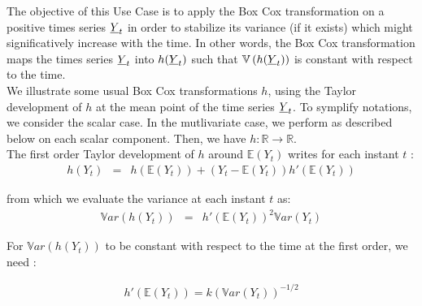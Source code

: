 \renewcommand{\filename}{docUC_StocProc_BoxCox.tex}
\renewcommand{\filetitle}{UC : Box Cox method : identification and transformation}

\HeaderIIILevel

\label{BoxCox}


The objective of this Use Case  is to apply the Box Cox transformation on a positive times series ${\underline{Y}}_t$ in order to stabilize its variance (if it exists) which might significatively increase with the time. In other words, the Box Cox transformation maps the times series ${\underline{Y}}_t$ into $h({\underline{Y}}_t)$ such that  $\mathbb{V}\left(h({\underline{Y}}_t)\right)$ is constant  with respect to the time.\\


We illustrate some usual Box Cox transformations $h$, using the Taylor development of $h$ at the mean point of the time series ${\underline{Y}}_t$. To symplify notations, we consider the scalar case. In the mutlivariate case, we perform as described below on each scalar component. Then,  we have $h : \mathbb{R} \longrightarrow \mathbb{R}$.\\
The first order Taylor development of $h$ around $\mathbb{E}(Y_t)$ writes for each instant $t$ : 
\begin{eqnarray*}
 h(Y_t) & = & h(\mathbb{E}(Y_t)) + (Y_t - \mathbb{E}(Y_t))h'(\mathbb{E}(Y_t)) 
\end{eqnarray*}

from which we evaluate the variance at each instant $t$ as:
\begin{eqnarray*}
 \mathbb{V}ar(h(Y_t)) & = & h'(\mathbb{E}(Y_t))^2  \mathbb{V}ar(Y_t) 
\end{eqnarray*}

For $\mathbb{V}ar(h(Y_t))$ to be constant with respect to the time at the first order, we need :

\begin{eqnarray}\label{eqh}
 h'(\mathbb{E}(Y_t)) = k \left( \mathbb{V}ar(Y_t) \right)^{-1/2}
\end{eqnarray}


